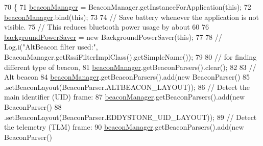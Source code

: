 \begin{DoxyCode}
70                                            \{
71         \hyperlink{classit_1_1unibo_1_1torsello_1_1bluetoothpositioning_1_1activities_1_1ApplicationActivity_a973c37226a3dbba6016966c3555aff65_a973c37226a3dbba6016966c3555aff65}{beaconManager} = BeaconManager.getInstanceForApplication(\textcolor{keyword}{this});
72         \hyperlink{classit_1_1unibo_1_1torsello_1_1bluetoothpositioning_1_1activities_1_1ApplicationActivity_a973c37226a3dbba6016966c3555aff65_a973c37226a3dbba6016966c3555aff65}{beaconManager}.bind(\textcolor{keyword}{this});
73 
74         \textcolor{comment}{// Save battery whenever the application is not visible.}
75         \textcolor{comment}{// This reduces bluetooth power usage by about 60%
76         \hyperlink{classit_1_1unibo_1_1torsello_1_1bluetoothpositioning_1_1activities_1_1ApplicationActivity_a85885639575161f4d73d4fc788f44ace_a85885639575161f4d73d4fc788f44ace}{backgroundPowerSaver} = \textcolor{keyword}{new} BackgroundPowerSaver(\textcolor{keyword}{this});
77 
78 \textcolor{comment}{//        Log.i("AltBeacon filter used:", BeaconManager.getRssiFilterImplClass().getSimpleName());}
79 
80         \textcolor{comment}{// for finding different type of beacon,}
81         \hyperlink{classit_1_1unibo_1_1torsello_1_1bluetoothpositioning_1_1activities_1_1ApplicationActivity_a973c37226a3dbba6016966c3555aff65_a973c37226a3dbba6016966c3555aff65}{beaconManager}.getBeaconParsers().clear();
82 
83         \textcolor{comment}{// Alt beacon}
84         \hyperlink{classit_1_1unibo_1_1torsello_1_1bluetoothpositioning_1_1activities_1_1ApplicationActivity_a973c37226a3dbba6016966c3555aff65_a973c37226a3dbba6016966c3555aff65}{beaconManager}.getBeaconParsers().add(\textcolor{keyword}{new} BeaconParser()
85                 .setBeaconLayout(BeaconParser.ALTBEACON\_LAYOUT));
86         \textcolor{comment}{// Detect the main identifier (UID) frame:}
87         \hyperlink{classit_1_1unibo_1_1torsello_1_1bluetoothpositioning_1_1activities_1_1ApplicationActivity_a973c37226a3dbba6016966c3555aff65_a973c37226a3dbba6016966c3555aff65}{beaconManager}.getBeaconParsers().add(\textcolor{keyword}{new} BeaconParser()
88                 .setBeaconLayout(BeaconParser.EDDYSTONE\_UID\_LAYOUT));
89         \textcolor{comment}{// Detect the telemetry (TLM) frame:}
90         \hyperlink{classit_1_1unibo_1_1torsello_1_1bluetoothpositioning_1_1activities_1_1ApplicationActivity_a973c37226a3dbba6016966c3555aff65_a973c37226a3dbba6016966c3555aff65}{beaconManager}.getBeaconParsers().add(\textcolor{keyword}{new} BeaconParser()
}
\end{DoxyCode}
